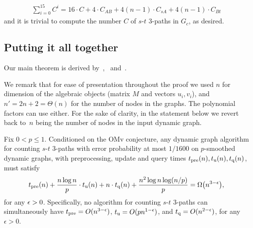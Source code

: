 \documentclass[letter,11pt]{article}
\newcommand{\omv}{\textnormal{\textsf{OMv}}\xspace}
\newcommand{\st}{$s$-$t$\xspace}
\newcommand{\paths}[3]{${#1}$-${#2}$ ${#3}$-paths\xspace}
\newcommand{\tp}{t_{\textnormal{pre}}}
\newcommand{\tu}{t_{\textnormal{u}}}
\newcommand{\tq}{t_{\textnormal{q}}}
\begin{document}
\begin{align}
\label{eq:number of paths in restricted graph}
\sum_{i=0}^{15} C^i
= 
16 \cdot C 
+ 
4\cdot C_{AB}
+
4(n-1)\cdot C_{sA}
+
4(n-1)\cdot C_{Bt}
\end{align}
and it is trivial to compute the number $C$ of \paths st3 in $G_c$, as desired.

\subsection{Putting it all together}
\label{sec:lb:wrapping_things_up}
Our main theorem is derived by~,~ and~.

We remark that for ease of presentation throughout the proof we used $n$ for dimension of the algebraic objects (matrix $M$ and vectors $u_i, v_i$), and $n' = 2n+2 = \Theta(n)$ for the number of nodes in the graphs. 
The polynomial factors can use either.
For the sake of clarity, in the statement below we revert back to~$n$ being the number of nodes in the input dynamic graph.

\begin{theorem}
\label{thm:lb for counting st3 paths}
    Fix $0 < p \leq 1$. 
    Conditioned on the \omv conjecture, any dynamic graph algorithm for counting \paths{s}{t}{3} with error probability at most $1/1600$ on $p$-smoothed dynamic graphs, with preprocessing, update and query times $\tp(n), \tu(n), \tq(n)$, must satisfy
    \[
\begin{aligned}
        \tp(n) + \frac{n \log n}{p} \cdot \tu(n) + n \cdot \tq(n) + \frac{n^2 \log n \log(n/p)}{p} = \Omega \left(n^{3-\eps}\right),
    \end{aligned}
    \]
    for any $\epsilon > 0$.
    Specifically, no algorithm for counting \st 3-paths 
    can simultaneously have
    $\tp=O(n^{3-\epsilon})$,
    $\tu=O(pn^{1-\epsilon})$,
    and
    $\tq=O(n^{2-\epsilon})$,  
    for any $\epsilon>0$.
\end{theorem}
\end{document}
